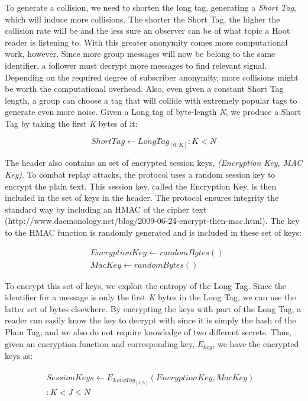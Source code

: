 To generate a collision, we need to shorten the long tag, generating a \textit{Short Tag}, which will induce more collisions. The shorter the Short Tag, the higher the collision rate will be and the less sure an observer can be of what topic a Hoot reader is listening to. With this greater anonymity comes more computational work, however. Since more group messages will now be belong to the same identifier, a follower must decrypt more messages to find relevant signal. Depending on the required degree of subscriber anonymity, more collisions might be worth the computational overhead. Also, even given a constant Short Tag length, a group can choose a tag that will collide with extremely popular tags to generate even more noise. Given a Long tag of byte-length \textit{N}, we produce a Short Tag by taking the first \textit{K} bytes of it:

\begin{equation*}
	\mathit{ShortTag} \leftarrow \mathit{LongTag}_{[0:K]} : K < N
\end{equation*}

The header also contains an set of encrypted session keys, \textit{(Encryption Key, MAC Key)}. To combat replay attacks, the protocol uses a random session key to encrypt the plain text. This session key, called the Encryption Key, is then included in the set of keys in the header. The protocol ensures integrity the standard way by including an HMAC of the cipher text (http://www.daemonology.net/blog/2009-06-24-encrypt-then-mac.html). The key to the HMAC function is randomly generated and is included in these set of keys: 

\begin{align*}
	& \mathit{EncryptionKey} \leftarrow \mathit{randomBytes}\left(\right) \\
	& \mathit{MacKey} \leftarrow \mathit{randomBytes}\left(\right)
\end{align*}

To encrypt this set of keys, we exploit the entropy of the Long Tag. Since the identifier for a message is only the first \textit{K} bytes in the Long Tag, we can use the latter set of bytes elsewhere. By encrypting the keys with part of the Long Tag, a reader can easily know the key to decrypt with since it is simply the hash of the Plain Tag, and we also do not require knowledge of two different secrets. Thus, given an encryption function and corresponding key, \textit{$E_{key}$}, we have the encrypted keys as:

\begin{align*}
\begin{split}
	\mathit{Session Keys} \leftarrow E_{\mathit{LongTag}_{[J:N]}}\left(\mathit{EncryptionKey},\mathit{MacKey}\right)& \\
	: K < J \leq N &
\end{split}	
\end{align*}

